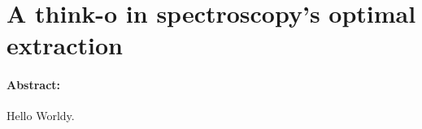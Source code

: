 \documentclass[12pt, letterpaper]{article}
\begin{document}
\section*{A think-o in spectroscopy's optimal extraction}

\paragraph{Abstract:} Hello Worldy.
\end{document}
